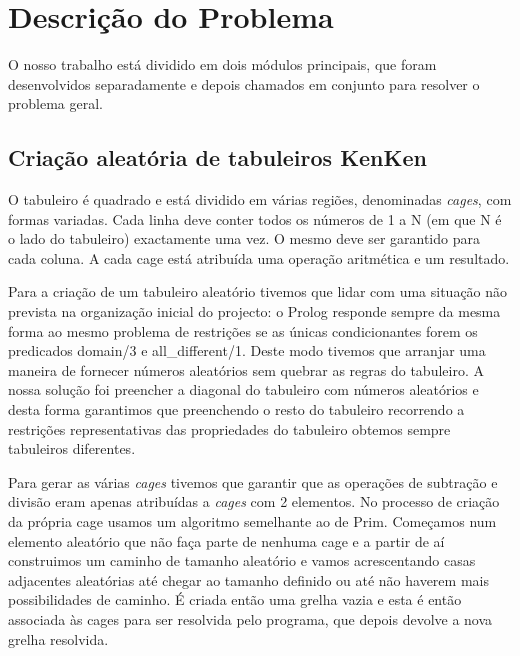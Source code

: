 \documentclass[runningheads,a4paper]{llncs}
\begin{document}
\newpage

\section{Descrição do Problema}
O nosso trabalho está dividido em dois módulos principais, que foram desenvolvidos separadamente e depois chamados em conjunto para resolver o problema geral.


\subsection{Criação aleatória de tabuleiros KenKen}

 O tabuleiro é quadrado e está dividido em várias regiões, denominadas \textit{cages}, com formas variadas.  Cada linha deve conter todos os números de 1 a N (em que N é o lado do tabuleiro) exactamente uma vez. O mesmo deve ser garantido para cada coluna. A cada cage está atribuída uma operação aritmética e um resultado.

 Para a criação de um tabuleiro aleatório tivemos que lidar com uma situação não prevista na organização inicial do projecto: o Prolog responde sempre da mesma forma ao mesmo problema de restrições se as únicas condicionantes forem os predicados domain/3 e all\_different/1. Deste modo tivemos que arranjar uma maneira de fornecer números aleatórios sem quebrar as regras do tabuleiro. A nossa solução foi preencher a diagonal do tabuleiro com números aleatórios e desta forma garantimos que preenchendo o resto do tabuleiro recorrendo a restrições representativas das propriedades do tabuleiro obtemos sempre tabuleiros diferentes.

Para gerar as várias \textit{cages} tivemos que garantir que as operações de subtração e divisão eram apenas atribuídas a \textit{cages} com 2 elementos. No processo de criação da própria cage usamos um algoritmo semelhante ao de Prim. Começamos num elemento aleatório que não faça parte de nenhuma cage e a partir de aí construimos um caminho de tamanho aleatório e vamos acrescentando casas adjacentes aleatórias até chegar ao tamanho definido ou até não haverem mais possibilidades de caminho. É criada então uma grelha vazia e esta é então associada às cages para ser resolvida pelo programa, que depois devolve a nova grelha resolvida.
\end{document}
